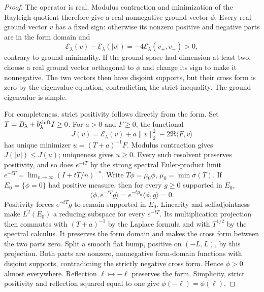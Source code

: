 \documentclass[11pt]{article}
\theoremstyle{remark}\newtheorem{remark}[theorem]{Remark}
\begin{document}
\begin{proof}
The operator is real. Modulus contraction and minimization of
the Rayleigh quotient therefore give a real nonnegative
ground vector $\phi$. Every real ground vector $v$ has a fixed
sign: otherwise its nonzero positive and negative parts are
in the form domain and
\[
 \mathcal E_\lambda(v)-\mathcal E_\lambda(|v|)
       =-4\mathcal E_\lambda(v_+,v_-)>0,
\]
contrary to ground minimality. If the ground space had dimension
at least two, choose a real ground vector orthogonal to $\phi$
and change its sign to make it nonnegative. The two vectors
then have disjoint supports, but their cross form is zero by
the eigenvalue equation, contradicting the strict inequality.
The ground eigenvalue is simple.

For completeness, strict positivity follows directly from the
form. Set $T=B_\lambda+b_\lambda^{\rm shift}I\ge0$.
For $a>0$ and $F\ge0$, the functional
\[
 J(v)=\mathcal E_\lambda(v)+a\|v\|_2^2
                              -2\Re\langle F,v\rangle
\]
has unique minimizer $u=(T+a)^{-1}F$.
Modulus contraction gives $J(|u|)\le J(u)$; uniqueness gives
$u\ge0$. Every such resolvent preserves positivity, and so
does $e^{-tT}$ by the strong spectral Euler-product limit
$e^{-tT}=\lim_{n\to\infty}(I+tT/n)^{-n}$.
Write $T\phi=\mu_0\phi$, $\mu_0=\min\sigma(T)$.
If $E_0=\{\phi=0\}$ had positive measure, then for every
$g\ge0$ supported in $E_0$,
\[
 \langle\phi,e^{-tT}g\rangle
     =e^{-t\mu_0}\langle\phi,g\rangle=0.
\]
Positivity forces $e^{-tT}g$ to remain supported in $E_0$.
Linearity and selfadjointness make $L^2(E_0)$ a reducing
subspace for every $e^{-tT}$. Its multiplication projection
then commutes with $(T+a)^{-1}$ by the Laplace formula
and with $T^{1/2}$ by the spectral calculus. It preserves
the form domain and makes the cross form between the two
parts zero. Split a smooth flat bump, positive on $(-L,L)$,
by this projection. Both parts are nonzero, nonnegative
form-domain functions with disjoint supports, contradicting
the strictly negative cross form. Hence $\phi>0$ almost everywhere.
Reflection $\ell\mapsto-\ell$ preserves the form. Simplicity,
strict positivity and reflection squared equal to one give
$\phi(-\ell)=\phi(\ell)$.
\end{proof}
\end{document}
